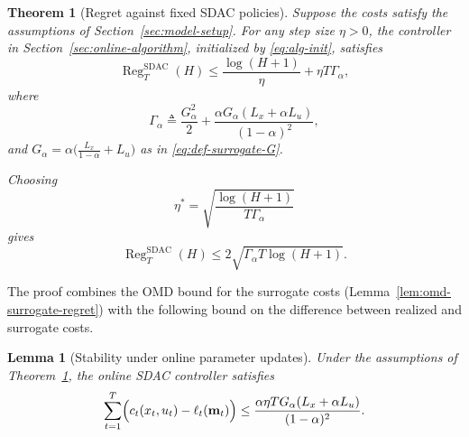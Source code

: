 \documentclass[journal]{IEEEtran}
\newtheorem{lemma}{Lemma}
\newtheorem{theorem}{Theorem}
\theoremstyle{remark}
\newcommand{\RegSDAC}[1]{\operatorname{Reg}_{#1}^{\mathrm{SDAC}}}
\begin{document}
\begin{theorem}[Regret against fixed SDAC policies]
\label{thm:regret-bound}
Suppose the costs satisfy the assumptions of Section~\ref{sec:model-setup}.
For any step size $\eta>0$, the controller in
Section~\ref{sec:online-algorithm}, initialized by \eqref{eq:alg-init}, satisfies
\begin{equation}
\label{eq:regret-theorem-bound}
\RegSDAC{T}(H)
\le
\frac{\log(H+1)}{\eta}+\eta T\Gamma_\alpha,
\end{equation}
where
\begin{equation}
\label{eq:def-Gamma-alpha}
\Gamma_\alpha
\triangleq
\frac{G_\alpha^2}{2}
+
\frac{\alpha G_\alpha(L_x+\alpha L_u)}{(1-\alpha)^2},
\end{equation}
and $G_\alpha=\alpha\bigl(\frac{L_x}{1-\alpha}+L_u\bigr)$ as in
\eqref{eq:def-surrogate-G}.

Choosing
\begin{equation}
\label{eq:def-optimal-step-size}
\eta^*=\sqrt{\frac{\log(H+1)}{T\Gamma_\alpha}}
\end{equation}
gives
\begin{equation}
\label{eq:regret-optimized-bound}
\RegSDAC{T}(H)\le 2\sqrt{\Gamma_\alpha T\log(H+1)}.
\end{equation}
\end{theorem}

The proof combines the OMD bound for the surrogate costs
(Lemma~\ref{lem:omd-surrogate-regret}) with the following bound on the
difference between realized and surrogate costs.
\begin{lemma}[Stability under online parameter updates]
\label{lem:contractive-deviation}
Under the assumptions of Theorem~\ref{thm:regret-bound}, the online SDAC
controller satisfies
\begin{equation}
\label{eq:stability-sum-bound}
\sum_{t=1}^T \Bigl(c_t(x_t,u_t)-\ell_t(\mathbf{m}_t)\Bigr)
\le
\frac{\alpha\eta T G_\alpha(L_x+\alpha L_u)}{(1-\alpha)^2}.
\end{equation}
\end{lemma}
\end{document}
